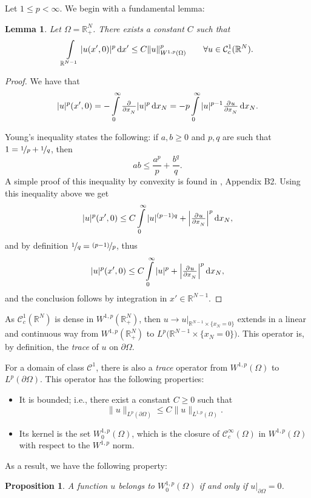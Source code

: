 \documentclass[a4paper,doc,11pt]{article}
\newtheorem{proposition}{Proposition}[theorem]
\newtheorem{lemma}[theorem]{Lemma}
\newcommand{\R}{\mathbb{R}}
\newcommand{\CC}{\mathcal{C}}
\begin{document}
Let \(1 \leq p < \infty\). We begin with a fundamental lemma:
\begin{lemma}
    Let \(\Omega = \R^N_+\). There exists a constant \(C\) such that
    \[
        \int\limits_{\R^{N-1}} | u(x',0) |^p \dif x' \leq C \|u\|^p_{W^{1,p} (\Omega)}
    \qquad
    \forall  u \in \CC^1_c(\R^N).
    \]
\end{lemma}
\begin{proof}
    We have that
    \[
        |u|^p (x',0) = -\int\limits_0^\infty \pd{ }{x_N} |u|^p \dif x_N
        = -p \int\limits_0^\infty |u|^{p-1} \pd{u}{x_N} \dif x_N.
    \]
    
    Young's inequality states the following: if \(a,b \geq 0\) and \(p,q\) are such that \( 1 = \nicefrac 1 p + \nicefrac 1 q \), then
    \[
        ab \leq \frac{a^p}{p} + \frac{b^q}{q}.
    \]
    A simple proof of this inequality by convexity is found in \citep{Evans}, Appendix B2. Using this inequality above we get
    \[
        |u|^p (x',0) 
        \leq C
        \int\limits_0^\infty |u|^{(p-1)q}  + \left|\pd{u}{x_N}\right|^p \dif x_N,
    \]
    and by definition \( \nicefrac 1 q = \nicefrac{(p -1)}{p} \), thus
    \[
        |u|^p (x',0) 
        \leq C
        \int\limits_0^\infty |u|^{p}  + \left|\pd{u}{x_N}\right|^p \dif x_N,
    \]
    and the conclusion follows by integration in \( x' \in \R^{N-1}\).
\end{proof}

As \(\CC_c^1 (\R^N)\) is dense in \(W^{1,p} (\R^N_+)\), then \(u \to u\big|_{\R^{N-1} \times \{x_N = 0\}}\) extends in a linear and continuous way from \(W^{1,p} (\R^N_+)\) to \( L^p \big(\R^{N-1} \times \{x_N = 0\}\big)\). This operator is, by definition, the \emph{trace} of \(u\) on \(\partial \Omega\). 

For a domain of class \(\CC^1\), there is also a \emph{trace} operator from \( W^{1,p} (\Omega)\) to \(L^p (\partial \Omega)\). This operator has the following properties:
\begin{itemize}
    \item It is bounded; i.e., there exist a constant \(C\geq 0\) such that
    \[
        \|u\|_{L^p (\partial \Omega)} \leq C \|u\|_{L^{1,p} ( \Omega)}.
    \]
    \item Its kernel is the set \( W_0^{1,p} (\Omega)\), which is the closure of \( \CC_c^\infty (\Omega)\) in \(W^{1,p}(\Omega)\) with respect to the \(W^{1,p}\) norm.
\end{itemize}

As a result, we have the following property:
\begin{proposition}
    A function \(u\) belongs to \( W^{1,p}_0 (\Omega)\) if and only if \( u \big|_{\partial \Omega} = 0\).
\end{proposition}
\end{document}
